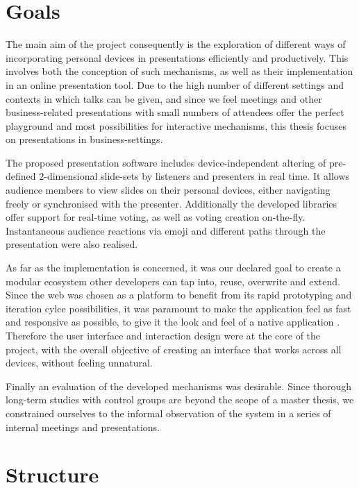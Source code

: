 \section{Goals}

The main aim of the project consequently is the exploration of different ways of incorporating personal devices in presentations efficiently and productively. This involves both the conception of such mechanisms, as well as their implementation in an online presentation tool.
Due to the high number of different settings and contexts in which talks can be given, and since we feel meetings and other business-related presentations with small numbers of attendees offer the perfect playground and most possibilities for interactive mechanisms, this thesis focuses on presentations in business-settings.

The proposed presentation software includes device-independent altering of pre-defined $2$-dimensional slide-sets by listeners and presenters in real time. It allows audience members to view slides on their personal devices, either navigating freely or synchronised with the presenter. Additionally the developed libraries offer support for real-time voting, as well as voting creation on-the-fly. Instantaneous audience reactions via emoji and different paths through the presentation were also realised.

As far as the implementation is concerned, it was our declared goal to create a modular ecosystem other developers can tap into, reuse, overwrite and extend. Since the web was chosen as a platform to benefit from its rapid prototyping and iteration cylce possibilities, it was paramount to make the application feel as fast and responsive as possible, to give it the look and feel of a native application \cite{Charland:WebVsNative}. Therefore the user interface and interaction design were at the core of the project, with the overall objective of creating an interface that works across all devices, without feeling unnatural.

Finally an evaluation of the developed mechanisms was desirable. Since thorough long-term studies with control groups are beyond the scope of a master thesis, we constrained ourselves to the informal observation of the system in a series of internal meetings and presentations.

\section{Structure}

